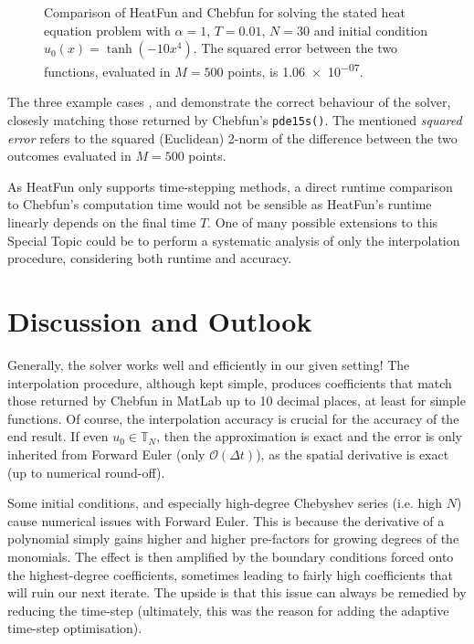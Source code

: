 \documentclass[12pt, a4paper]{article}
\newcommand{\chebyshev}{Chebyshev\xspace}
\newcommand{\heatfun}{\textcolor{themecolor3}{HeatFun}\xspace}
\begin{document}
  \begin{figure}[H]
    \centering
    \caption{Comparison of \heatfun and Chebfun for solving the stated heat equation problem with $\alpha = 1$, $T = 0.01$, $N = 30$ and initial condition $u_0(x) = \tanh(-10x^4)$. The squared error between the two functions, evaluated in $M = 500$ points, is \num{1.06e-07}.}
    \label{fig:example3}
  \end{figure}

  The three example cases ,  and  demonstrate the correct behaviour of the solver, closesly matching those returned by Chebfun's \texttt{pde15s()}. The mentioned \textit{squared error} refers to the squared (Euclidean) 2-norm of the difference between the two outcomes evaluated in $M = 500$ points.

  As \heatfun only supports time-stepping methods, a direct runtime comparison to Chebfun's computation time would not be sensible as \heatfun's runtime linearly depends on the final time $T$.
  One of many possible extensions to this Special Topic could be to perform a systematic analysis of only the interpolation procedure, considering both runtime and accuracy.

  \pagebreak
  \section{Discussion and Outlook}
  Generally, the solver works well and efficiently in our given setting!
  The interpolation procedure, although kept simple, produces coefficients that match those returned by Chebfun in MatLab up to 10 decimal places, at least for simple functions.
  Of course, the interpolation accuracy is crucial for the accuracy of the end result.
  If even $u_0 \in \mathbb{T}_N$, then the approximation is exact and the error is only inherited from Forward Euler (only $\mathcal{O}(\Delta t)$), as the spatial derivative is exact (up to numerical round-off).

  Some initial conditions, and especially high-degree \chebyshev series (i.e. high $N$) cause numerical issues with Forward Euler.
  This is because the derivative of a polynomial simply gains higher and higher pre-factors for growing degrees of the monomials.
  The effect is then amplified by the boundary conditions forced onto the highest-degree coefficients, sometimes leading to fairly high coefficients that will ruin our next iterate.
  The upside is that this issue can always be remedied by reducing the time-step (ultimately, this was the reason for adding the adaptive time-step optimisation).
\end{document}

